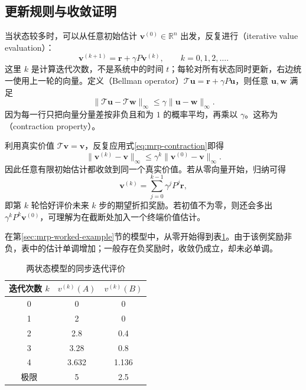 \documentclass[UTF8]{ctexart}
\begin{document}
\subsection{更新规则与收敛证明}

当状态较多时，可以从任意初始估计 $\boldsymbol v^{(0)}\in\mathbb R^n$ 出发，反复进行（iterative value evaluation）：
\begin{equation}
  \boldsymbol v^{(k+1)}=\boldsymbol r+\gamma P\boldsymbol v^{(k)},
  \qquad k=0,1,2,\ldots.
  \label{eq:mrp-iteration}
\end{equation}
这里 $k$ 是计算迭代次数，不是系统中的时间 $t$；每轮对所有状态同时更新，右边统一使用上一轮的向量。定义（Bellman operator）$\mathcal T\boldsymbol u=\boldsymbol r+\gamma P\boldsymbol u$，则任意 $\boldsymbol u,\boldsymbol w$ 满足
\begin{equation}
  \|\mathcal T\boldsymbol u-\mathcal T\boldsymbol w\|_\infty
  \leq\gamma\|\boldsymbol u-\boldsymbol w\|_\infty.
  \label{eq:mrp-contraction}
\end{equation}
因为每一行只把向量分量差按非负且和为 $1$ 的概率平均，再乘以 $\gamma$。这称为（contraction property）。

利用真实价值 $\mathcal T\boldsymbol v=\boldsymbol v$，反复应用式\eqref{eq:mrp-contraction}即得
\begin{equation}
  \|\boldsymbol v^{(k)}-\boldsymbol v\|_\infty
  \leq\gamma^k\|\boldsymbol v^{(0)}-\boldsymbol v\|_\infty.
  \label{eq:mrp-iteration-error}
\end{equation}
因此任意有限初始估计都收敛到同一个真实价值。若从零向量开始，归纳可得
\begin{equation}
  \boldsymbol v^{(k)}=\sum_{j=0}^{k-1}\gamma^jP^j\boldsymbol r,
  \label{eq:mrp-finite-step}
\end{equation}
即第 $k$ 轮恰好评价未来 $k$ 步的期望折扣奖励。若初值不为零，则还会多出 $\gamma^kP^k\boldsymbol v^{(0)}$，可理解为在截断处加入一个终端价值估计。

在第\ref{sec:mrp-worked-example}节的模型中，从零开始得到表\ref{tab:mrp-iterations}。由于该例奖励非负，表中的估计单调增加；一般存在负奖励时，收敛仍成立，却未必单调。
\begin{table}
  \centering
  \caption{两状态模型的同步迭代评价}
  \label{tab:mrp-iterations}
  \begin{tabular}{c c c}
    \toprule
    迭代次数 $k$ & $v^{(k)}(A)$ & $v^{(k)}(B)$ \\
    \midrule
    0 & 0 & 0 \\
    1 & 2 & 0 \\
    2 & 2.8 & 0.4 \\
    3 & 3.28 & 0.8 \\
    4 & 3.632 & 1.136 \\
    极限 & 5 & 2.5 \\
    \bottomrule
  \end{tabular}
\end{table}
\end{document}
